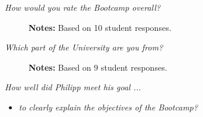 \begin{boenumerate}
\item \textit{How would you rate the Bootcamp overall?}
\begin{figure}[h!]\centering
{}\hspace{0.5cm}
\begin{center}
\begin{minipage}[t]{0.85\columnwidth}\vspace{-0.75cm}
\item\scriptsize{\textbf{Notes:} Based on 10 student responses.}
\end{minipage}
\end{center}
\end{figure}
\FloatBarrier
\item \textit{Which part of the University are you from?}

\begin{figure}[h!]\centering
{}\hspace{0.5cm}
\begin{center}
\begin{minipage}[t]{0.85\columnwidth}\vspace{-0.75cm}
\item\scriptsize{\textbf{Notes:} Based on 9 student responses.}
\end{minipage}
\end{center}
\end{figure}
\FloatBarrier
\newpage

\item \textit{How well did Philipp meet his goal ...}
\begin{itemize}
\item \textit{to clearly explain the objectives of the Bootcamp?}


\end{itemize}
\end{boenumerate}
